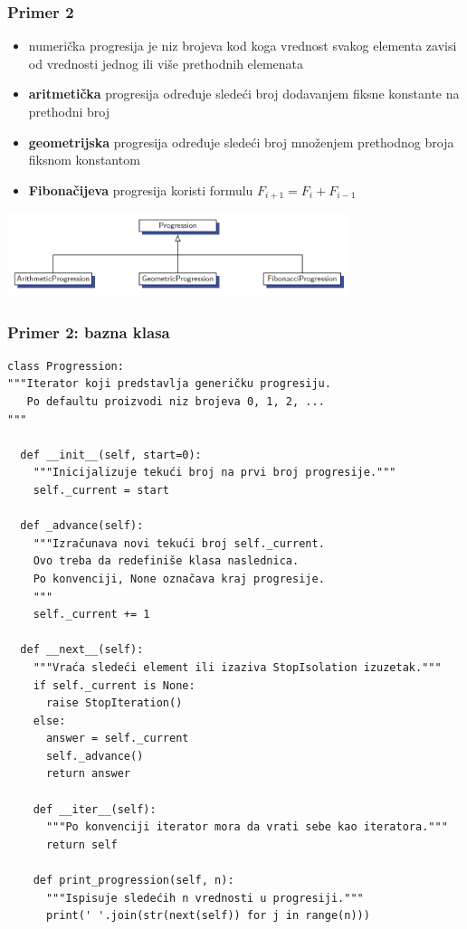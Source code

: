 \documentclass[compress,aspectratio=169]{beamer}
\begin{document}
\begin{frame}[fragile]
  \frametitle{Primer 2}
  \begin{itemize}
    \item numerička progresija je niz brojeva kod koga vrednost svakog elementa zavisi od vrednosti jednog ili više prethodnih elemenata
    \item \textbf{aritmetička} progresija određuje sledeći broj dodavanjem fiksne konstante na prethodni broj
    \item \textbf{geometrijska} progresija određuje sledeći broj množenjem prethodnog broja fiksnom konstantom
    \item \textbf{Fibonačijeva} progresija koristi formulu $F_{i+1} = F_i + F_{i-1}$
  \end{itemize}
  \begin{center}
    \includegraphics[width=10cm]{asp-03-pic05.png}
  \end{center}
\end{frame}

\begin{frame}[fragile,shrink=20]
  \frametitle{Primer 2: bazna klasa}
\begin{verbatim}
class Progression:
"""Iterator koji predstavlja generičku progresiju.
   Po defaultu proizvodi niz brojeva 0, 1, 2, ...
"""

  def __init__(self, start=0):
    """Inicijalizuje tekući broj na prvi broj progresije."""
    self._current = start
  
  def _advance(self):
    """Izračunava novi tekući broj self._current.
    Ovo treba da redefiniše klasa naslednica.
    Po konvenciji, None označava kraj progresije.
    """
    self._current += 1
    
  def __next__(self):
    """Vraća sledeći element ili izaziva StopIsolation izuzetak."""
    if self._current is None:
      raise StopIteration()
    else:
      answer = self._current
      self._advance()
      return answer
      
    def __iter__(self):
      """Po konvenciji iterator mora da vrati sebe kao iteratora."""
      return self
    
    def print_progression(self, n):
      """Ispisuje sledećih n vrednosti u progresiji."""
      print(' '.join(str(next(self)) for j in range(n)))
\end{verbatim}
\end{frame}
\end{document}
